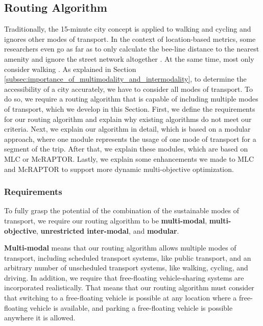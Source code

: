 \subsection{Routing Algorithm}
\label{subs:routing_algorithm}
Traditionally, the 15-minute city concept is applied to walking and cycling and ignores other modes of transport.
In the context of location-based metrics, some researchers even go as far as to only calculate the bee-line distance to the nearest amenity and ignore the street network altogether . At the same time, most only consider walking .
As explained in Section \ref{subsec:importance_of_multimodality_and_intermodality}, to determine the accessibility of a city accurately, we have to consider all modes of transport.
To do so, we require a routing algorithm that is capable of including multiple modes of transport, which we develop in this Section.
First, we define the requirements for our routing algorithm and explain why existing algorithms do not meet our criteria.
Next, we explain our algorithm in detail, which is based on a modular approach, where one module represents the usage of one mode of transport for a segment of the trip.
After that, we explain these modules, which are based on MLC or McRAPTOR.
Lastly, we explain some enhancements we made to MLC and McRAPTOR to support more dynamic multi-objective optimization.

\subsubsection{Requirements}
\label{subsubsec:requirements}

To fully grasp the potential of the combination of the sustainable modes of transport, we require our routing algorithm to be \textbf{multi-modal}, \textbf{multi-objective}, \textbf{unrestricted inter-modal}, and \textbf{modular}.

\textbf{Multi-modal} means that our routing algorithm allows multiple modes of transport, including scheduled transport systems, like public transport, and an arbitrary number of unscheduled transport systems, like walking, cycling, and driving.
In addition, we require that free-floating vehicle-sharing systems are incorporated realistically.
That means that our routing algorithm must consider that switching to a free-floating vehicle is possible at any location where a free-floating vehicle is available, and parking a free-floating vehicle is possible anywhere it is allowed.

